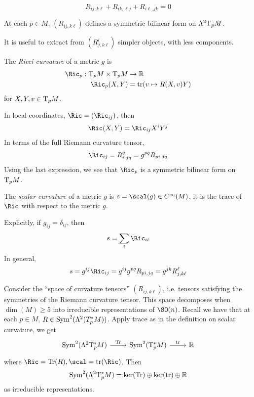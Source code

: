 \documentclass{article}
\begin{document}
\begin{corollary}
    \[R_{ij, k\ell} + R_{ik, \ell j} + R_{i\ell, jk} = 0\]
\end{corollary}

\begin{corollary}
    At each \(p \in M\), \((R_{ij, k\ell})\) defines a symmetric bilinear form on \(\Lambda^2\mathrm{T}_p M\).
\end{corollary}

It is useful to extract from \((R^i_{j,k\ell})\) simpler objects, with less components.

\begin{definition}
     The \emph{Ricci curvature} of a metric \(g\) is
    \begin{align*}
        \Ric_p : \T_pM \times \T_pM &\to \R \\
        \Ric_p(X, Y) &= \tr(v \mapsto R(X, v)Y)
    \end{align*}
    for \(X, Y, v \in \mathrm{T}_pM\).
\end{definition}

In local coordinates, \(\Ric = (\Ric_{ij})\), then
\[\Ric(X, Y) = \Ric_{ij}X^iY^j\]
In terms of the full Riemann curvature tensor,
\[\Ric_{ij} = R^q_{i, jq} = g^{pq}R_{pi, jq}\]
Using the last expression, we see that \(\Ric_p\) is a symmetric bilinear form on \(\mathrm{T}_pM\).

\begin{definition}
     The \emph{scalar curvature} of a metric \(g\) is \(s = \scal(g) \in C^\infty(M)\), it is the trace of \(\Ric\) with respect to the metric \(g\).
\end{definition}

Explicitly, if \(g_{ij} = \delta_{ij}\), then
\[s = \sum_i\Ric_{ii}\]
In general,
\[s = g^{ij}\Ric_{ij} = g^{ij}g^{pq}R_{pi, jq} = g^{jk}R^\ell_{j, k\ell}\]

\begin{lemma}
     Consider the ``space of curvature tensors'' \((R_{ij, k\ell})\), i.e. tensors satisfying the symmetries of the Riemann curvature tensor. This space decomposes when \(\dim(M) \ge 5\) into irreducible representations of \(\SO(n)\). Recall we have that at each \(p \in M\), \(R \in \operatorname{Sym}^2(\Lambda^2(T^*_pM))\). Apply trace as in the definition on scalar curvature, we get
\[\begin{tikzcd}
	{\Sym^2(\Lambda^2\T_p^*M)} & {\Sym^2(\T_p^*M)} & \R
	\arrow["\Tr", from=1-1, to=1-2]
	\arrow["\tr", from=1-2, to=1-3]
\end{tikzcd}\]
    where \(\Ric = \Tr(R), \scal = \tr(\Ric)\). Then
    \[\operatorname{Sym}^2(\Lambda^2\mathrm{T}^*_pM) = \ker(\Tr) \oplus \ker(\tr) \oplus \mathbb{R}\]
    as irreducible representations.
\end{lemma}
\end{document}

